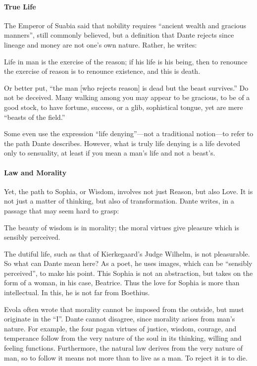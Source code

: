 \paragraph{True Life}
The Emperor of Suabia said that nobility requires “ancient wealth and gracious manners”, still commonly believed, but a definition that Dante rejects since lineage and money are not one's own nature. Rather, he writes:

\begin{quotex}
Life in man is the exercise of the reason; if his life is his being, then to renounce the exercise of reason is to renounce existence, and this is death.

\end{quotex}
Or better put, “the man [who rejects reason] is dead but the beast survives.” Do not be deceived. Many walking among you may appear to be gracious, to be of a good stock, to have fortune, success, or a glib, sophistical tongue, yet are mere “beasts of the field.”

Some even use the expression “life denying”—not a traditional notion—to refer to the path Dante describes. However, what is truly life denying is a life devoted only to sensuality, at least if you mean a man's life and not a beast's.

\paragraph{Law and Morality}
Yet, the path to Sophia, or Wisdom, involves not just Reason, but also Love. It is not just a matter of thinking, but also of transformation. Dante writes, in a passage that may seem hard to grasp:

\begin{quotex}
The beauty of wisdom is in morality; the moral virtues give pleasure which is sensibly perceived.

\end{quotex}
The dutiful life, such as that of Kierkegaard's Judge Wilhelm, is not pleasurable. So what can Dante mean here? As a poet, he uses images, which can be “sensibly perceived”, to make his point. This Sophia is not an abstraction, but takes on the form of a woman, in his case, Beatrice. Thus the love for Sophia is more than intellectual. In this, he is not far from Boethius.

Evola often wrote that morality cannot be imposed from the outside, but must originate in the “I”. Dante cannot disagree, since morality arises from man's nature. For example, the four pagan virtues of justice, wisdom, courage, and temperance follow from the very nature of the soul in its thinking, willing and feeling functions. Furthermore, the natural law derives from the very nature of man, so to follow it means not more than to live as a man. To reject it is to die.

